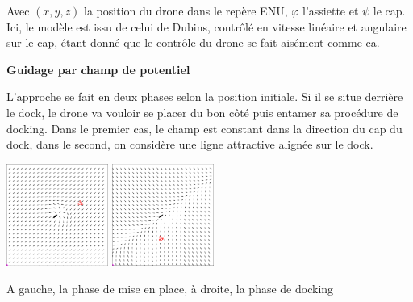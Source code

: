 \documentclass[portrait,final,a0paper,fontscale=0.3]{baposter}
\begin{document}
\begin{poster}
{	Avec $(x,y,z)$ la position du drone dans le repère ENU, $\varphi$ l'assiette et $\psi$ le cap. Ici,
	le modèle est issu de celui de Dubins, contrôlé en vitesse linéaire et angulaire sur le cap, étant
	donné que le contrôle du drone se fait aisément comme ca.


	
    
    \vspace{\baselineskip}
	
	\begin{center}
		\textbf{Guidage par champ de potentiel}
	\end{center}
	\vspace{-0.3cm}

	L'approche se fait en deux phases selon la position initiale. Si il se situe derrière le dock,
	le drone va vouloir se placer du bon côté puis entamer sa procédure de docking. Dans le premier cas,
	le champ est constant dans la direction du cap du dock, dans le second, on considère une ligne attractive
	alignée sur le dock.

	\begin{center}
		\includegraphics[width=0.25\textwidth]{imgs/ScreenshotCase2.png}
		\hfil
		\includegraphics[width=0.25\textwidth]{imgs/ScreenshotCase1.png}
		
		A gauche, la phase de mise en place, à droite, la phase de docking
	\end{center}
}

\end{poster}
\end{document}
